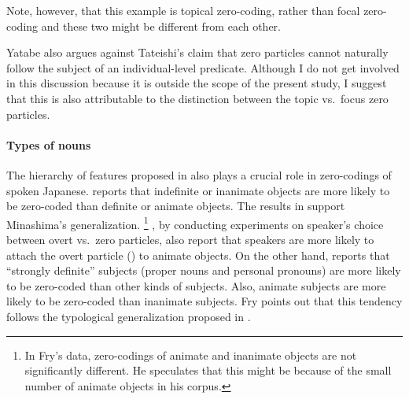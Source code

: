 Note, however, that this example is topical zero-coding,
rather than focal zero-coding and
these two might be different from each other.

Yatabe also argues against Tateishi's claim that
zero particles cannot naturally follow
the subject of an individual-level predicate.
Although I do not get involved in this discussion
because it is outside the scope of the present study,
I suggest that this is also attributable to
the distinction between the topic vs.~focus zero particles.
%


\paragraph{Types of nouns}

The hierarchy of features proposed in 
also plays a crucial role in zero-codings of spoken Japanese.
 reports that
indefinite or inanimate objects are more likely to be zero-coded
than definite or animate objects.
The results in  support Minashima's generalization.%
 \footnote{
 In Fry's data, zero-codings of animate and inanimate objects are not
 significantly different.
 He speculates that this might be because of the small number of
 animate objects in his corpus.
 }
, by conducting experiments on speaker's choice between overt vs.~zero particles,
also report that speakers are more likely to attach the overt particle () to animate objects.
On the other hand,
 reports that
``strongly definite'' subjects (proper nouns and personal pronouns)
are more likely to be zero-coded than other kinds of subjects.
Also, animate subjects are more likely to be zero-coded than
inanimate subjects.
Fry points out that this tendency follows the typological generalization
proposed in .

